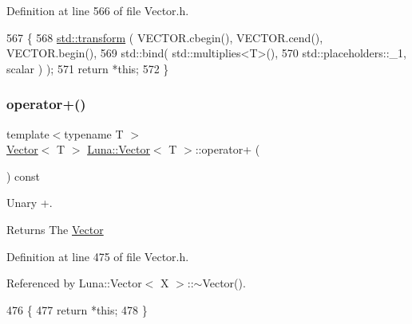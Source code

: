 Definition at line 566 of file Vector.\+h.


\begin{DoxyCode}
567   \{
568     \hyperlink{namespaceHeat__plot_aeaa6785bedcad63b4bd40e8cb1bad8a0}{std::transform} ( VECTOR.cbegin(), VECTOR.cend(), VECTOR.begin(),
569                      std::bind( std::multiplies<T>(),
570                                 std::placeholders::\_1, scalar ) );
571     \textcolor{keywordflow}{return} *\textcolor{keyword}{this};
572   \}
\end{DoxyCode}
\mbox{\label{classLuna_1_1Vector_a98436d0360c521cc7200f3f65201230e}} 
\subsubsection{\texorpdfstring{operator+()}{operator+()}\hspace{0.1cm}{\footnotesize\ttfamily [1/2]}}
{\footnotesize\ttfamily template$<$typename T $>$ \\
\hyperlink{classLuna_1_1Vector}{Vector}$<$ T $>$ \hyperlink{classLuna_1_1Vector}{Luna\+::\+Vector}$<$ T $>$\+::operator+ (\begin{DoxyParamCaption}{ }\end{DoxyParamCaption}) const\hspace{0.3cm}{\ttfamily [inline]}}



Unary +. 

\begin{DoxyReturn}{Returns}
The \hyperlink{classLuna_1_1Vector}{Vector} 
\end{DoxyReturn}


Definition at line 475 of file Vector.\+h.



Referenced by Luna\+::\+Vector$<$ X $>$\+::$\sim$\+Vector().


\begin{DoxyCode}
476   \{
477     \textcolor{keywordflow}{return} *\textcolor{keyword}{this};
478   \}
\end{DoxyCode}
\mbox{\label{classLuna_1_1Vector_a4250a1034080a224eed0c2cd8ee0fcd2}} 
